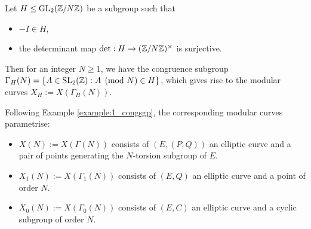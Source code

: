 \begin{example}
Let $H \leq \operatorname{GL}_2(\mathbb{Z}/N\mathbb{Z})$ be a subgroup such that
\begin{itemize}
    \item $-I \in H$,
    \item the determinant map $\det: H \rightarrow (\mathbb{Z}/N\mathbb{Z})^\times$ is surjective.
\end{itemize}
Then for an integer $N \geq 1$, we have the congruence subgroup $\Gamma_H(N) = \{ A \in \operatorname{SL}_2(\mathbb{Z}) : A \pmod{N} \in H \}$, which gives rise to the modular curves $X_H := X(\Gamma_H(N))$.

Following Example \ref{example:1_congsgp}, the corresponding modular curves parametrise:

\begin{itemize}
    \item $X(N):= X(\Gamma(N))$ consists of $(E,(P,Q))$ an elliptic curve and a pair of points generating the $N$-torsion subgroup of $E$.
    \item $X_1(N) := X(\Gamma_1(N))$ consists of $(E,Q)$ an elliptic curve and a point of order $N$.
    \item $X_0(N) := X(\Gamma_0(N))$ consists of $(E,C)$ an elliptic curve and a cyclic subgroup of order $N$.
\end{itemize}
\end{example}